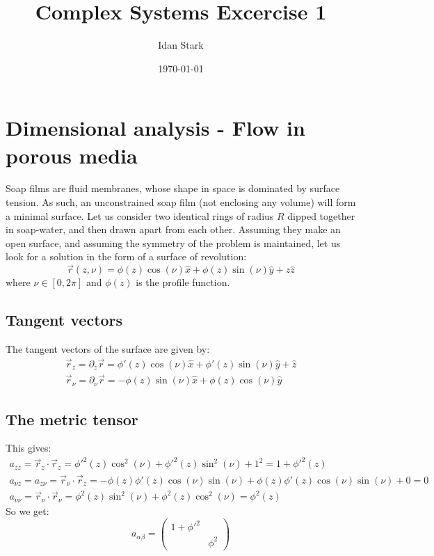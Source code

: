 \documentclass{article}
\title{Complex Systems Excercise 1}
\author{Idan Stark}
\date{\today}
\begin{document}
\maketitle

\section{Dimensional analysis - Flow in porous media}
Soap films are fluid membranes, whose shape in space is dominated by surface tension. As such, an unconstrained soap film (not enclosing any volume) will form a minimal surface.
\newline
Let us consider two identical rings of radius $R$ dipped together in soap-water, and then drawn apart from each other. Assuming they make an open surface, and assuming the symmetry of the problem is maintained, let us look for a solution in the form of a surface of revolution:
\begin{equation}
    \vec{r}(z, \nu) = \phi(z)\cos(\nu)\hat{x} + \phi(z)\sin(\nu)\hat{y} + z\hat{z}
\end{equation}
where $\nu \in [0, 2\pi]$ and $\phi(z)$ is the profile function.
\subsection{Tangent vectors}
The tangent vectors of the surface are given by:
\begin{equation}
    \boxed{
\begin{gathered}
        \vec{r}_z = \partial_z \vec{r} = \phi'(z)\cos(\nu)\hat{x} + \phi'(z)\sin(\nu)\hat{y} + \hat{z}
        \\
        \vec{r}_\nu = \partial_\nu \vec{r} = -\phi(z)\sin(\nu)\hat{x} + \phi(z)\cos(\nu)\hat{y}
\end{gathered}
    }
\end{equation}
\subsection{The metric tensor}
This gives:
\begin{equation}
\begin{gathered}
    a_{zz} = \vec{r}_z\cdot\vec{r}_z = \phi'^2(z)\cos^2(\nu) + \phi'^2(z)\sin^2(\nu) + 1^2 = 1 + \phi'^2(z)
    \\
    a_{\nu z} = a_{z \nu} = \vec{r}_\nu\cdot\vec{r}_z = -\phi(z)\phi'(z)\cos(\nu)\sin(\nu) + \phi(z)\phi'(z)\cos(\nu)\sin(\nu) + 0 = 0
    \\
    a_{\nu\nu} = \vec{r}_\nu\cdot\vec{r}_\nu = \phi^2(z)\sin^2(\nu) + \phi^2(z)\cos^2(\nu) = \phi^2(z)
\end{gathered}
\end{equation}
So we get:
\begin{equation}
    \boxed{a_{\alpha\beta} = \begin{pmatrix}
        1 + \phi'^2 & \\ & \phi^2
    \end{pmatrix}}
\end{equation}
\end{document}
